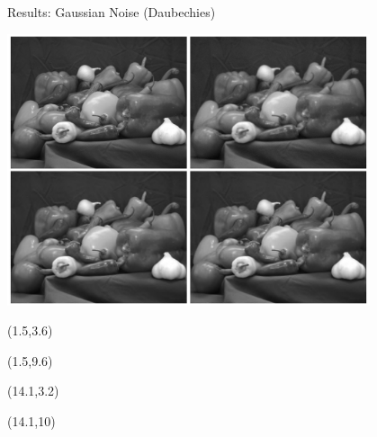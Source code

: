 \documentclass[12pt]{beamer}
\begin{document}
\begin{frame}{Results: Gaussian Noise (Daubechies)}
\begin{center}
\vspace{-3 mm}
\includegraphics[width = 0.8\textwidth]{../figures/waveletGaussD.pdf} 
\end{center}

\begin{textblock}{5}(1.5,3.6)
\end{textblock}

\begin{textblock}{5}(1.5,9.6)
\end{textblock}

\begin{textblock}{5}(14.1,3.2)
\end{textblock}

\begin{textblock}{5}(14.1,10)
\end{textblock}
\end{frame}
\end{document}

